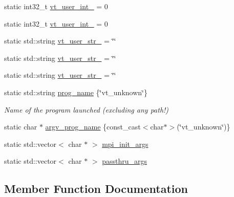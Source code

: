 \begin{DoxyCompactItemize}
\item 
static int32\+\_\+t \hyperlink{structvt_1_1arguments_1_1_arg_config_ac80c25baf981f06e7f37045371a5336d}{vt\+\_\+user\+\_\+int\+\_} = 0
\item 
static int32\+\_\+t \hyperlink{structvt_1_1arguments_1_1_arg_config_a2dc50d3f0598a0a998923695f681c93a}{vt\+\_\+user\+\_\+int\+\_} = 0
\item 
static std\+::string \hyperlink{structvt_1_1arguments_1_1_arg_config_a892f7cf1b072e8fec60f5b88762f151e}{vt\+\_\+user\+\_\+str\+\_} = \char`\"{}\char`\"{}
\item 
static std\+::string \hyperlink{structvt_1_1arguments_1_1_arg_config_aaac3dd90077934c6faa99570d9b95ca1}{vt\+\_\+user\+\_\+str\+\_} = \char`\"{}\char`\"{}
\item 
static std\+::string \hyperlink{structvt_1_1arguments_1_1_arg_config_a848bd14c34337ef8d48fd740061a4923}{vt\+\_\+user\+\_\+str\+\_} = \char`\"{}\char`\"{}
\item 
static std\+::string \hyperlink{structvt_1_1arguments_1_1_arg_config_a48436d61577adf3f28fd3b3377a41b8c}{prog\+\_\+name} \{\char`\"{}vt\+\_\+unknown\char`\"{}\}
\begin{DoxyCompactList}\small\item\em Name of the program launched (excluding any path!) \end{DoxyCompactList}\item 
static char $\ast$ \hyperlink{structvt_1_1arguments_1_1_arg_config_aae77bdfe755eeaf6ea8d2f00dffc6077}{argv\+\_\+prog\+\_\+name} \{const\+\_\+cast$<$char$\ast$$>$(\char`\"{}vt\+\_\+unknown\char`\"{})\}
\item 
static std\+::vector$<$ char $\ast$ $>$ \hyperlink{structvt_1_1arguments_1_1_arg_config_a742020618b402b1eeafb9898d34978d7}{mpi\+\_\+init\+\_\+args}
\item 
static std\+::vector$<$ char $\ast$ $>$ \hyperlink{structvt_1_1arguments_1_1_arg_config_a730c6c732bc622c6d1d29961380f5c72}{passthru\+\_\+args}
\end{DoxyCompactItemize}


\subsection{Member Function Documentation}
\mbox{\label{structvt_1_1arguments_1_1_arg_config_a03db534c8fd127f38570a49425b6afbd}} 
